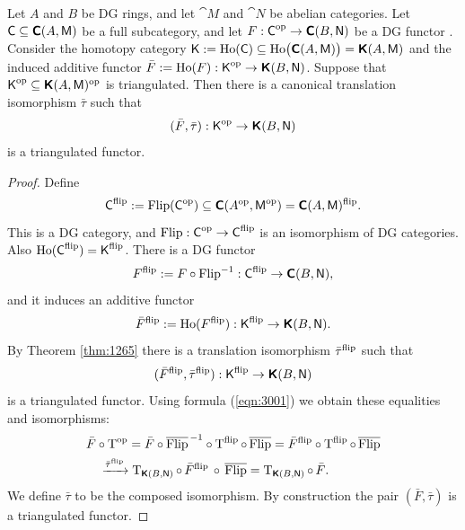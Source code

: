 \begin{thm} \label{thm:2995}
Let $A$ and $B$ be DG rings, and let $\cat{M}$ and $\cat{N}$ be abelian 
categories. Let 
$\operatorname{\mathsf{C}} \subseteq \boldsymbol{\mathsf{C}}(A, \operatorname{\mathsf{M}})$ be a full subcategory, and let 
$F : \operatorname{\mathsf{C}}^{\mathrm{op}} \to \boldsymbol{\mathsf{C}}(B, \operatorname{\mathsf{N}})$
be a DG functor%
.
Consider the homotopy category 
$\operatorname{\mathsf{K}} := \operatorname{Ho}(\operatorname{\mathsf{C}}) \subseteq 
\operatorname{Ho} \bigl( \boldsymbol{\mathsf{C}}(A, \operatorname{\mathsf{M}}) \bigr) = \boldsymbol{\mathsf{K}}(A, \operatorname{\mathsf{M}})$
and the induced additive functor 
$\bar{F} := \operatorname{Ho}(F) : \operatorname{\mathsf{K}}^{\mathrm{op}} \to \boldsymbol{\mathsf{K}}(B, \operatorname{\mathsf{N}})$.
Suppose that 
$\operatorname{\mathsf{K}}^{\mathrm{op}} \subseteq \boldsymbol{\mathsf{K}}(A, \operatorname{\mathsf{M}})^{\mathrm{op}}$ is triangulated.
Then there is a canonical translation isomorphism 
$\bar{\tau}$ such that 
\[ (\bar{F}, \bar{\tau}) : \operatorname{\mathsf{K}}^{\mathrm{op}} \to \boldsymbol{\mathsf{K}}(B, \operatorname{\mathsf{N}}) \]
is a triangulated functor. 
\end{thm}

\begin{proof}
Define 
\[ \operatorname{\mathsf{C}}^{\mathrm{flip}} := \operatorname{Flip}(\operatorname{\mathsf{C}}^{\mathrm{op}}) \subseteq
\boldsymbol{\mathsf{C}}(A^{\mathrm{op}}, \operatorname{\mathsf{M}}^{\mathrm{op}}) =
\boldsymbol{\mathsf{C}}(A, \operatorname{\mathsf{M}})^{\mathrm{flip}} . \]
This is a DG category, and 
$\operatorname{Flip} : \operatorname{\mathsf{C}}^{\mathrm{op}} \to \operatorname{\mathsf{C}}^{\mathrm{flip}}$
is an isomorphism of DG categories. Also
$\operatorname{Ho} (\operatorname{\mathsf{C}}^{\mathrm{flip}}) = \operatorname{\mathsf{K}}^{\mathrm{flip}}$.
There is a DG functor
\[ F^{\mathrm{flip}} := F \circ \operatorname{Flip}^{-1} : \operatorname{\mathsf{C}}^{\mathrm{flip}} 
\to \boldsymbol{\mathsf{C}}(B, \operatorname{\mathsf{N}}) , \]
and it induces an additive functor 
\[ \bar{F}^{\mathrm{flip}} := \operatorname{Ho}(F^{\mathrm{flip}}) : 
\operatorname{\mathsf{K}}^{\mathrm{flip}} \to \boldsymbol{\mathsf{K}}(B, \operatorname{\mathsf{N}}) . \]
By Theorem \ref{thm:1265} there is a translation isomorphism 
$\bar{\tau}^{\mathrm{flip}}$ such that 
\[ (\bar{F}^{\mathrm{flip}}, \bar{\tau}^{\mathrm{flip}}) : 
\operatorname{\mathsf{K}}^{\mathrm{flip}} \to \boldsymbol{\mathsf{K}}(B, \operatorname{\mathsf{N}})  \]
is a triangulated functor.
Using formula (\ref{eqn:3001}) we obtain these equalities and isomorphisms:
\[ \begin{aligned}
& \bar{F} \circ \operatorname{T}^{\mathrm{op}} = 
\bar{F} \circ \overline{\operatorname{Flip}}^{\, -1} \circ \operatorname{T}^{\mathrm{flip}} \circ \, 
\overline{\operatorname{Flip}} 
= \bar{F}^{\mathrm{flip}} \circ \operatorname{T}^{\mathrm{flip}} \circ \, 
\overline{\operatorname{Flip}} 
\\
& \quad 
\xrightarrow{\bar{\tau}^{\mathrm{flip}}}
\operatorname{T}_{\boldsymbol{\mathsf{K}}(B, \operatorname{\mathsf{N}})} \circ \, \bar{F}^{\mathrm{flip}} \, \circ  \, 
\overline{\operatorname{Flip}} 
= \operatorname{T}_{\boldsymbol{\mathsf{K}}(B, \operatorname{\mathsf{N}})} \circ \, \bar{F} . 
\end{aligned} \]
We define $\bar{\tau}$ to be the composed isomorphism. By construction 
the pair $(\bar{F}, \bar{\tau})$ is a triangulated functor. 
\end{proof}

